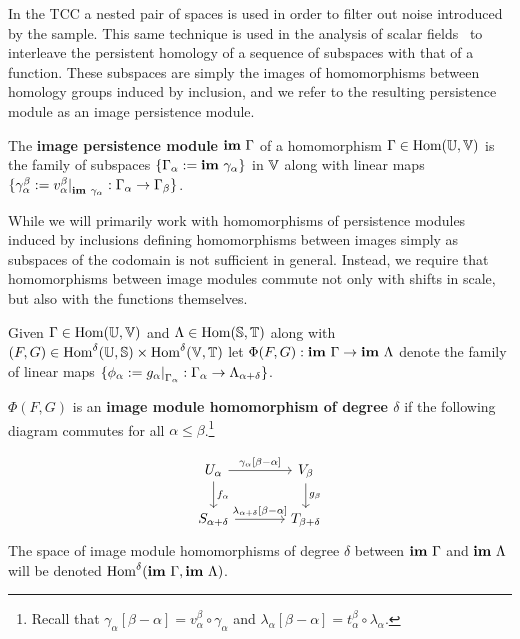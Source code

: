 
In the TCC a nested pair of spaces is used in order to filter out noise introduced by the sample.
This same technique is used in the analysis of scalar fields~\cite{chazal09analysis} to interleave the persistent homology of a sequence of subspaces with that of a function.
These subspaces are simply the images of homomorphisms between homology groups induced by inclusion, and we refer to the resulting persistence module as an image persistence module.

\begin{definition}
  The \textbf{image persistence module} $\mathbf{im}~\Gamma$ of a homomorphism $\Gamma\in\mathrm{Hom}(\mathbb{U},\mathbb{V})$ is the family of subspaces $\{\Gamma_\alpha :=\mathbf{im}~\gamma_\alpha\}$ in $\mathbb{V}$ along with linear maps $\{\gamma_\alpha^\beta := v_\alpha^\beta\mathord{\mid}_{\mathbf{im}~\gamma_\alpha} : \Gamma_\alpha\to\Gamma_\beta\}$.
\end{definition}

While we will primarily work with homomorphisms of persistence modules induced by inclusions defining homomorphisms between images simply as subspaces of the codomain is not sufficient in general.
Instead, we require that homomorphisms between image modules commute not only with shifts in scale, but also with the functions themselves.

\begin{definition}
  Given $\Gamma\in\mathrm{Hom}(\mathbb{U},\mathbb{V})$ and $\Lambda\in\mathrm{Hom}(\mathbb{S},\mathbb{T})$ along with $(F,G)\in\mathrm{Hom}^\delta(\mathbb{U},\mathbb{S})\times\mathrm{Hom}^\delta(\mathbb{V},\mathbb{T})$ let $\Phi(F, G) : \mathbf{im}~\Gamma\to\mathbf{im}~\Lambda$ denote the family of linear maps $\{\phi_\alpha := g_\alpha\mathord{\mid}_{\Gamma_\alpha} : \Gamma_\alpha\to\Lambda_{\alpha+\delta}\}$.

  $\Phi(F, G)$ is an \textbf{image module homomorphism of degree $\delta$} if the following diagram commutes for all $\alpha\leq\beta$.\footnote{Recall that $\gamma_\alpha[\beta-\alpha] = v_\alpha^\beta\circ\gamma_\alpha$ and $\lambda_\alpha[\beta-\alpha] = t_\alpha^\beta\circ\lambda_\alpha$.}

  \begin{equation}\label{dgm:image_homomorphism}
    \begin{tikzcd}[column sep=large]
        U_\alpha\arrow{r}{\gamma_\alpha[\beta-\alpha]}\arrow{d}{f_\alpha} &
      V_\beta\arrow{d}{g_\beta}\\
      S_{\alpha+\delta}\arrow{r}{\lambda_{\alpha+\delta}[\beta-\alpha]} &
      T_{\beta +\delta}
  \end{tikzcd}\end{equation}
  The space of image module homomorphisms of degree $\delta$ between $\mathbf{im}~\Gamma$ and $\mathbf{im}~\Lambda$ will be denoted $\mathrm{Hom}^\delta(\mathbf{im}~\Gamma,\mathbf{im}~\Lambda)$.
\end{definition}

